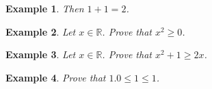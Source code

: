 \documentclass[12pt]{article}
\newtheorem{example}{Example}
\begin{document}
\begin{example}
    Then $1+1=2$.
\end{example}

\begin{example}
    Let $x\in\mathbb{R}$. Prove that $x^2\ge 0$.
\end{example}

\begin{example}
    Let $x\in\mathbb{R}$. Prove that $x^2 + 1\ge 2x$.
\end{example}

\begin{example}
    Prove that $1.0 \le 1 \le 1$.
\end{example}
\end{document}
